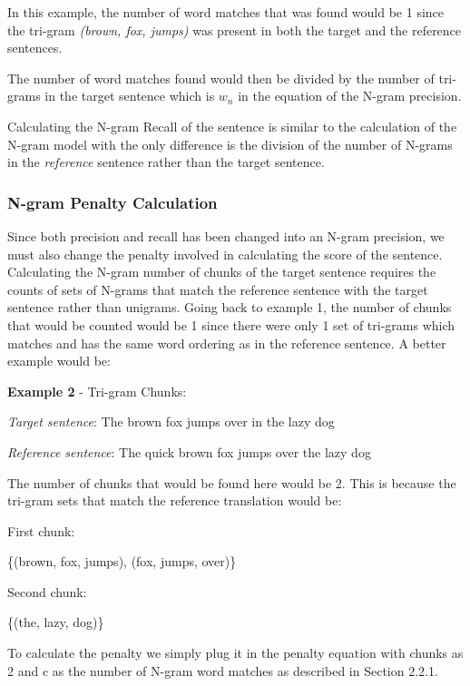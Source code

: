 \documentclass[11pt,letterpaper]{article}
\newcommand\tab[1][1cm]{\hspace*{#1}}
\begin{document}
In this example, the number of word matches that was found would be 1 since the tri-gram \textit{(brown, fox, jumps)} was present in both the target and the reference sentences.

The number of word matches found would then be divided by the number of tri-grams in the target sentence which is \(w_{n}\) in the equation of the N-gram precision.

Calculating the N-gram Recall of the sentence is similar to the calculation of the N-gram model with the only difference is the division of the number of N-grams in the \textit{reference} sentence rather than the target sentence.

\subsubsection{N-gram Penalty Calculation}

Since both precision and recall has been changed into an N-gram precision, we must also change the penalty involved in calculating the score of the sentence. Calculating the N-gram number of chunks of the target sentence requires the counts of sets of N-grams that match the reference sentence with the target sentence rather than unigrams. Going back to example 1, the number of chunks that would be counted would be 1 since there were only 1 set of tri-grams which matches and has the same word ordering as in the reference sentence. A better example would be:

\smallskip

\textbf{Example 2} - Tri-gram Chunks:

\smallskip

\textit{Target sentence}: The brown fox jumps over in the lazy dog
\smallskip

\textit{Reference sentence}: The quick brown fox jumps over the lazy dog
\smallskip

The number of chunks that would be found here would be 2. This is because the tri-gram sets that match the reference translation would be:

First chunk: 

\tab\{(brown, fox, jumps), (fox, jumps, over)\}

Second chunk: 

\tab\{(the, lazy, dog)\}

To calculate the penalty we simply plug it in the penalty equation with chunks as 2 and c as the number of N-gram word matches as described in Section 2.2.1. 
\end{document}
